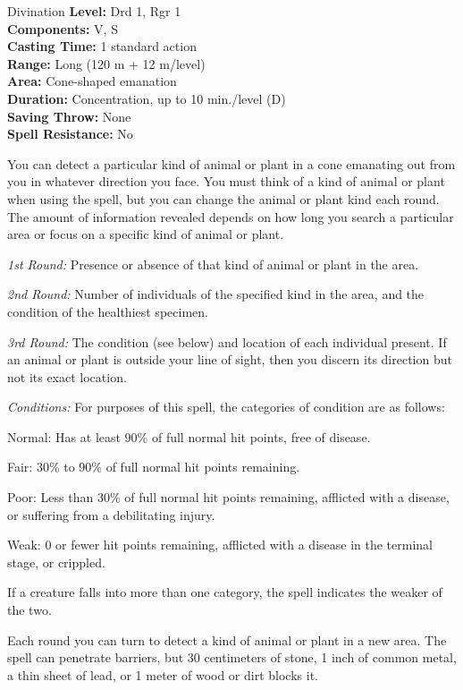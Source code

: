 {Divination}
{
	\textbf{Level:}
	Drd 1, Rgr 1\\
	\textbf{Components:}
	V, S\\
	\textbf{Casting Time:}
	1 standard action\\
	\textbf{Range:}
	Long (120 m + 12 m/level)\\
	\textbf{Area:}
	Cone-shaped emanation\\
	\textbf{Duration:}
	Concentration, up to 10 min./level (D)\\
	\textbf{Saving Throw:}
	None\\
	\textbf{Spell Resistance:}
	No\\
}
{
	You can detect a particular kind of animal or plant in a cone emanating out from you in whatever direction you face. You must think of a kind of animal or plant when using the spell, but you can change the animal or plant kind each round. The amount of information revealed depends on how long you search a particular area or focus on a specific kind of animal or plant.

	\textit{1st Round:}
	Presence or absence of that kind of animal or plant in the area.

	\textit{2nd Round:}
	Number of individuals of the specified kind in the area, and the condition of the healthiest specimen.

	\textit{3rd Round:}
	The condition (see below) and location of each individual present. If an animal or plant is outside your line of sight, then you discern its direction but not its exact location.

	\textit{Conditions:}
	For purposes of this spell, the categories of condition are as follows:

	Normal:
	Has at least 90\% of full normal hit points, free of disease.

	Fair:
	30\% to 90\% of full normal hit points remaining.

	Poor:
	Less than 30\% of full normal hit points remaining, afflicted with a disease, or suffering from a debilitating injury.

	Weak:
	0 or fewer hit points remaining, afflicted with a disease in the terminal stage, or crippled.

	If a creature falls into more than one category, the spell indicates the weaker of the two.

	Each round you can turn to detect a kind of animal or plant in a new area. The spell can penetrate barriers, but 30 centimeters of stone, 1 inch of common metal, a thin sheet of lead, or 1 meter of wood or dirt blocks it.

}
